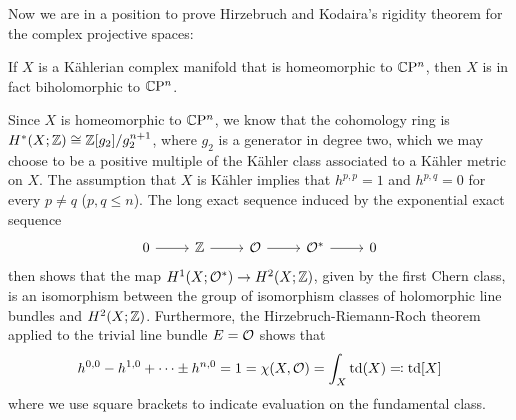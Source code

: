Now we are in a position to prove Hirzebruch and Kodaira's rigidity theorem for the complex projective spaces:

\begin{thm}\label{thm:rigidCPn}
	If $X$ is a K\"ahlerian complex manifold that is homeomorphic to $\mathbb{C}\mathrm{P}^n$, then $X$ is in fact biholomorphic to $\mathbb{C}\mathrm{P}^n$.
\end{thm}

\begin{myproof}
	Since $X$ is homeomorphic to $\mathbb{C}\mathrm{P}^n$, we know that the cohomology ring is $H^*(X;\mathbb{Z})\cong \mathbb{Z}[g_2]/g_2^{n+1}$, where $g_2$ is a generator in degree two, which we may choose to be a positive multiple of the K\"ahler class associated to a K\"ahler metric on $X$. The assumption that $X$ is K\"ahler implies that $h^{p,p}=1$ and $h^{p,q}=0$ for every $p\neq q$ ($p,q\leq n$). The long exact sequence induced by the exponential exact sequence
	\begin{equation*}
		\begin{tikzcd}
			0 \ar[r] & \Z \ar[r] & \mc O \ar[r] & \mc O^* \ar[r] & 0
		\end{tikzcd}
	\end{equation*}
	then shows that the map $H^1(X;\mathcal{O}^*) \to H^2(X;\mathbb{Z})$, given by the first Chern class, is an isomorphism between the group of isomorphism classes of holomorphic line bundles and $H^2(X;\mathbb{Z})$. Furthermore, the Hirzebruch-Riemann-Roch theorem applied to the trivial line bundle $E=\mathcal{O}$ shows that 
	\begin{equation*}
		h^{0,0}-h^{1,0}+\dots \pm h^{n,0}=1=\chi(X,\mathcal{O})=\int_X \operatorname{td}(X)\eqqcolon \operatorname{td}[X]
	\end{equation*}
	where we use square brackets to indicate evaluation on the fundamental class.
	

\end{myproof}
